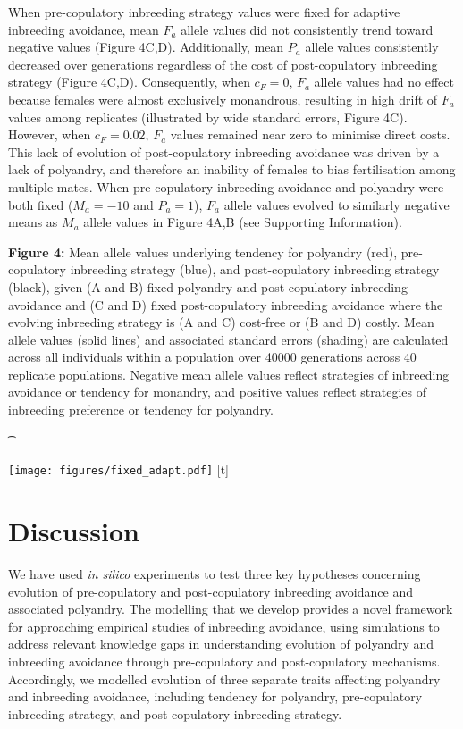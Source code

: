 \documentclass[10pt,letterpaper]{article}
\begin{document}
When pre-copulatory inbreeding strategy values were fixed for adaptive inbreeding avoidance, mean $F_{a}$ allele values did not consistently trend toward negative values (Figure 4C,D). Additionally, mean $P_{a}$ allele values consistently decreased over generations regardless of the cost of post-copulatory inbreeding strategy (Figure 4C,D). Consequently, when $c_{F}=0$, $F_{a}$ allele values had no effect because females were almost exclusively monandrous, resulting in high drift of $F_{a}$ values among replicates (illustrated by wide standard errors, Figure 4C). However, when $c_{F}=0.02$, $F_{a}$ values remained near zero to minimise direct costs. This lack of evolution of post-copulatory inbreeding avoidance was driven by a lack of polyandry, and therefore an inability of females to bias fertilisation among multiple mates. When pre-copulatory inbreeding avoidance and polyandry were both fixed ($M_{a}=-10$ and $P_{a}=1$), $F_{a}$ allele values evolved to similarly negative means as $M_{a}$ allele values in Figure 4A,B (see Supporting Information). 

{\color{Gray}
\begin{adjustwidth}{-2.2in}{0in}
{%
   \begin{justify}\vspace{0.25 mm} \textbf{Figure 4:} Mean allele values underlying tendency for polyandry (red), pre-copulatory inbreeding strategy (blue), and post-copulatory inbreeding strategy (black), given (A and B) fixed polyandry and post-copulatory inbreeding avoidance and (C and D) fixed post-copulatory inbreeding avoidance where the evolving inbreeding strategy is (A and C) cost-free or (B and D) costly. Mean allele values (solid lines) and associated standard errors (shading) are calculated across all individuals within a population over 40000 generations across 40 replicate populations. Negative mean allele values reflect strategies of inbreeding avoidance or tendency for monandry, and positive values reflect strategies of inbreeding preference or tendency for polyandry.\end{justify}{\t}%
}
{%
   \texttt{[image: figures/fixed\_adapt.pdf]}%
}%
[t]
\end{adjustwidth}
}

\section*{Discussion}

We have used \textit{in silico} experiments to test three key hypotheses concerning evolution of pre-copulatory and post-copulatory inbreeding avoidance and associated polyandry. The modelling that we develop provides a novel framework for approaching empirical studies of inbreeding avoidance, using simulations to address relevant knowledge gaps in understanding evolution of polyandry and inbreeding avoidance through pre-copulatory and post-copulatory mechanisms. Accordingly, we modelled evolution of three separate traits affecting polyandry and inbreeding avoidance, including tendency for polyandry, pre-copulatory inbreeding strategy, and post-copulatory inbreeding strategy. 
\end{document}
